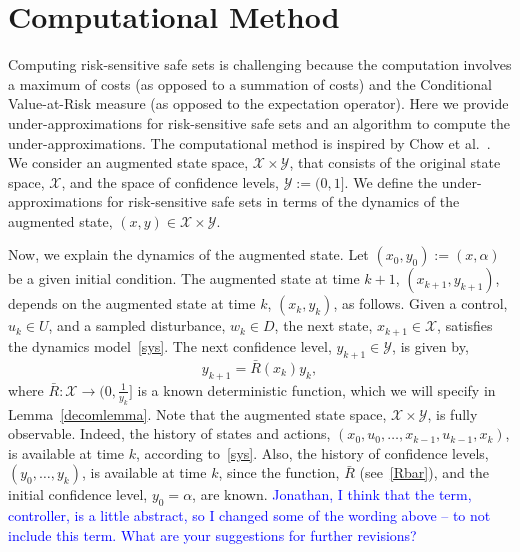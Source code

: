 \documentclass[letterpaper, 10 pt, conference]{ieeeconf}  %
\begin{document}

\section{Computational Method}
\label{sec::alg}
Computing risk-sensitive safe sets is challenging because the computation involves a maximum of costs (as opposed to a summation of costs)
and the Conditional Value-at-Risk measure (as opposed to the expectation operator). Here we provide under-approximations 
for risk-sensitive safe sets and an algorithm to compute the under-approximations. 
The computational method is inspired by Chow et al.~\cite{chow2015risk}.
We consider an augmented state space, $\mathcal{X} \times \mathcal{Y}$, that consists of the original state space, $\mathcal{X}$, 
and the space of confidence levels, $\mathcal{Y} := (0,1]$.
We define the under-approximations for risk-sensitive safe sets in terms of the dynamics of the augmented state, $(x,y) \in \mathcal{X} \times \mathcal{Y}$. 

Now, we explain the dynamics of the augmented state.
Let $(x_0, y_0) := (x, \alpha)$ be a given initial condition.
The augmented state at time $k+1$, $(x_{k+1}, y_{k+1})$, depends on the augmented state at time $k$, $(x_k, y_k)$, as follows.
Given a control, $u_k \in U$, and a sampled disturbance, $w_k \in D$, the next state, $x_{k+1} \in \mathcal{X}$, satisfies the dynamics model~\eqref{sys}. 
The next confidence level, $y_{k+1} \in \mathcal{Y}$, is given by,
\begin{equation}
y_{k+1} = \bar{R}(x_k) y_k,\label{Rbar}
\end{equation}
where $\bar{R} : \mathcal{X} \to (0, \frac{1}{y_k}]$ is a known deterministic function, 
which we will specify in Lemma~\ref{decomlemma}. 
Note that the augmented state space, $\mathcal{X} \times \mathcal{Y}$, is fully observable.
Indeed, the history of states and actions, $(x_0, u_0, \hdots, x_{k-1}, u_{k-1}, x_{k})$, is available at time $k$, according to~\eqref{sys}. 
Also, the history of confidence levels, $(y_0, \hdots, y_k)$, is available at time $k$, since
the function, $\bar{R}$ (see~\eqref{Rbar}), and the initial confidence level, $y_0 = \alpha$, are known.
\textcolor{blue}{Jonathan, I think that the term, controller, is a little abstract, so I changed some of the wording above -- to not include this term. 
What are your suggestions for further revisions?} 
\end{document}
